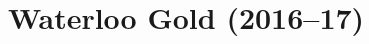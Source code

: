 \documentclass[10pt]{article}
\title{\vspace{-7ex}\Large{Waterloo Gold (2016--17)}}
\author{}
\date{}
\begin{document}
    
\begin{landscape}
  \begin{multicols}{2}
    \pagestyle{fancy}
    \maketitle

    \vspace{-16ex}
    \tableofcontents
    
  \end{multicols}
\end{landscape}
\end{document}
